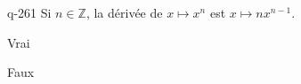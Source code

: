 \begin{truefalse}{q-261}
Si $n \in \mathbb Z$, la dérivée de $x\mapsto x^n$ est $x\mapsto nx^{n-1}$.
\item Vrai
\item* Faux
\end{truefalse}

